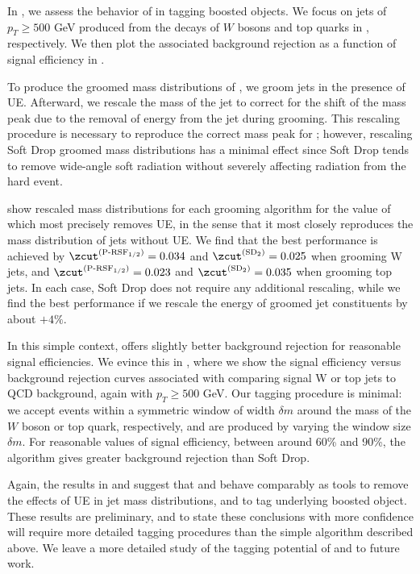 \documentclass[letterpaper,11pt]{article}
\begin{document}
   In , we assess the behavior of \PIRANHA{} in tagging boosted objects.
   We focus on jets of \(p_T \geq 500\) GeV produced from the decays of \(W\) bosons and top quarks in , respectively.
   We then plot the associated background rejection as a function of signal efficiency in .

To produce the groomed mass distributions of , we groom jets in the presence of UE.
%
 Afterward, we rescale the mass of the jet to correct for the shift of the mass peak due to the removal of energy from the jet during grooming.
   This rescaling procedure is necessary to reproduce the correct mass peak for ;
   however, rescaling Soft Drop groomed mass distributions has a minimal effect since Soft Drop tends to remove wide-angle soft radiation without severely affecting radiation from the hard event.

    show rescaled mass distributions for each grooming algorithm for the value of \zcut{} which most precisely removes UE, in the sense that it most closely reproduces the mass distribution of jets without UE.
   We find that the best performance is achieved by \(\zcut^{(\text{P-RSF}_{1/2})}=0.034\) and \(\zcut^{(\text{SD}_2)}=0.025\) when grooming W jets, and \(\zcut^{(\text{P-RSF}_{1/2})}=0.023\) and \(\zcut^{(\text{SD}_2)}=0.035\) when grooming top jets.
   In each case, Soft Drop does not require any additional rescaling, while we find the best performance if we rescale the energy of  groomed jet constituents by about \(+4\%\).

   In this simple context,  offers slightly better background rejection for reasonable signal efficiencies.
   We evince this in , where we show the signal efficiency versus background rejection curves associated with comparing signal W or top jets to QCD background, again with \(p_T \geq 500\) GeV.
   Our tagging procedure is minimal:
   we accept events within a symmetric window of width \(\delta m\) around the mass of the \(W\) boson or top quark, respectively, and  are produced by varying the window size \(\delta m\).
   For reasonable values of signal efficiency, between around 60\% and 90\%, the  algorithm gives greater background rejection than Soft Drop.

   Again, the results in  and  suggest that  and  behave comparably as tools to remove the effects of UE in jet mass distributions, and to tag underlying boosted object.
   These results are preliminary, and to state these conclusions with more confidence will require more detailed tagging procedures than the simple algorithm described above.
   We leave a more detailed study of the tagging potential of  and \PIRANHA{} to future work.
\end{document}

